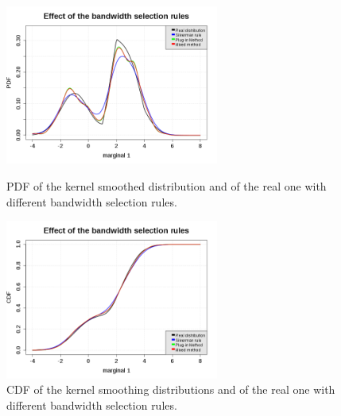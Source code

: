              \begin{figure}[H]
               \begin{minipage}{7cm}
                 \begin{center}
                   \includegraphics[width=7cm]{Figures/kernelSmoothingBWSel_pdf.png}
                   \caption{PDF of the kernel smoothed distribution and of the real one with different bandwidth selection rules.}
                   \label{pdf_KernelSmoothBWSel}
                 \end{center}
               \end{minipage}
               \hfill
               \begin{minipage}{7cm}
                 \begin{center}
                   \includegraphics[width=7cm]{Figures/kernelSmoothingBWSel_cdf.png}
                   \caption{CDF of the kernel smoothing distributions and of the real one with different bandwidth selection rules.}
                   \label{cdf_KernelSmoothBWSel}
                 \end{center}
               \end{minipage}
             \end{figure}

